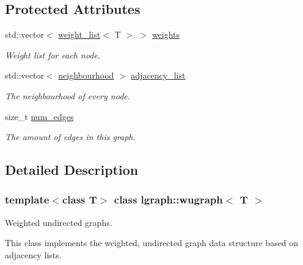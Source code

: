 \subsection*{Protected Attributes}
\begin{DoxyCompactItemize}
\item 
std\+::vector$<$ \hyperlink{namespacelgraph_a1e0fd5ef0a78b2a92da48adbed265cb6}{weight\+\_\+list}$<$ T $>$ $>$ \hyperlink{classlgraph_1_1wxgraph_a6f8c983edc82913c2d78b7bc871defe8}{weights}
\begin{DoxyCompactList}\small\item\em Weight list for each node. \end{DoxyCompactList}\item 
\mbox{\label{classlgraph_1_1xxgraph_a31cf82d0b20be05290be259dc97a51ec}} 
std\+::vector$<$ \hyperlink{namespacelgraph_a052e7766c13f3a43cec0aec8173fdede}{neighbourhood} $>$ \hyperlink{classlgraph_1_1xxgraph_a31cf82d0b20be05290be259dc97a51ec}{adjacency\+\_\+list}
\begin{DoxyCompactList}\small\item\em The neighbourhood of every node. \end{DoxyCompactList}\item 
\mbox{\label{classlgraph_1_1xxgraph_a6765a9a3be42f6e0f824635c593b35d7}} 
size\+\_\+t \hyperlink{classlgraph_1_1xxgraph_a6765a9a3be42f6e0f824635c593b35d7}{num\+\_\+edges}
\begin{DoxyCompactList}\small\item\em The amount of edges in this graph. \end{DoxyCompactList}\end{DoxyCompactItemize}


\subsection{Detailed Description}
\subsubsection*{template$<$class T$>$\newline
class lgraph\+::wugraph$<$ T $>$}

Weighted undirected graphs. 

This class implements the weighted, undirected graph data structure based on adjacency lists.


